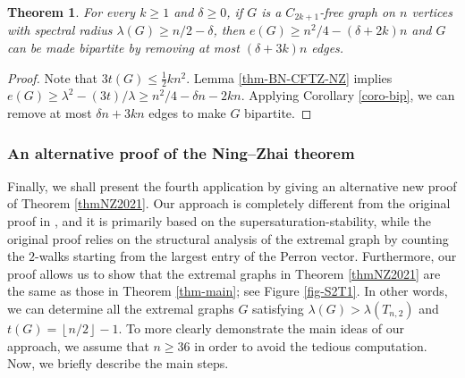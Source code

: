 \documentclass[11pt]{article}
\newtheorem{theorem}{Theorem}[section]
\begin{document}
\begin{theorem}
For every $k\ge 1$ and $\delta \ge 0$, if $G$ is a 
 $C_{2k+1}$-free graph on $n$ vertices with spectral radius 
 $\lambda (G)\ge {n}/{2} - \delta $, then 
$e(G)\ge n^2/4 - (\delta+2k)n$ and $G$ can be made bipartite by removing at most $(\delta +3k)n$ edges. 
\end{theorem}

\begin{proof}
Note that $3t(G)\le \frac{1}{2}kn^2$. 
Lemma \ref{thm-BN-CFTZ-NZ} implies 
$e(G)\ge \lambda^2- (3t)/ \lambda \ge n^2/4 - \delta n - 2kn$. Applying Corollary \ref{coro-bip}, we can remove at most $ \delta n + 3kn$ edges to make $G$ bipartite. 
\end{proof}


\subsubsection{An alternative proof of the Ning--Zhai theorem}


 Finally, 
we shall present the fourth application by giving  
an alternative new proof of Theorem \ref{thmNZ2021}. 
Our approach is completely different from the original proof in \cite{NZ2021}, 
and it is primarily based on the supersaturation-stability, 
while the original proof relies on the structural analysis of the extremal graph  by counting the $2$-walks starting from the largest entry of the Perron vector.  
Furthermore, our proof allows us to show that 
 the extremal graphs in Theorem \ref{thmNZ2021} are the same as those 
 in Theorem \ref{thm-main}; see Figure \ref{fig-S2T1}. 
In other words, we can determine 
all the extremal graphs $G$ satisfying
 $\lambda (G) > \lambda (T_{n,2})$ and 
 $t(G)= \left\lfloor {n}/{2}\right\rfloor -1$.  
To more clearly demonstrate the main ideas of our approach, we assume that $n\ge 36$ in order to avoid the tedious computation. Now, we briefly describe the main steps.
\end{document}
